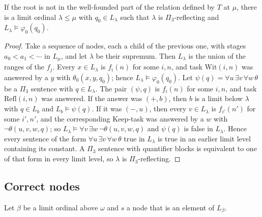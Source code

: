 \documentclass[11pt]{article}
\begin{document}
\begin{statement} If the root is not in the well-founded part of the relation defined by $T$ at $\mu$,
there is a limit ordinal $\lambda \le \mu$ with $q_0 \in L_{\lambda}$ such that $\lambda$ is $\Pi_3$-reflecting and
$L_{\lambda} \models \varphi_0(q_0)$.
\end{statement}

\begin{proof}
Take a sequence of nodes, each a child of the previous one, with stages $a_0 < a_1 < \cdots$ in $L_{\mu}$, and let
$\lambda$ be their supremum. Then $L_{\lambda}$ is the union of the ranges of the $f_j$. Every $x \in L_{\lambda}$ is
$f_i(n)$ for some $i, n$, and task $\mathrm{Wit}(i, n)$ was answered by a $y$ with $\theta_0(x, y, q_0)$; hence
$L_{\lambda} \models \varphi_0(q_0)$. Let $\psi(q) = \forall u\, \exists v\, \forall w\, \theta$ be a $\Pi_3$ sentence
with $q \in L_{\lambda}$. The pair $(\psi, q)$ is $f_i(n)$ for some $i, n$, and task $\mathrm{Refl}(i, n)$ was
answered. If the
answer was $(+, b)$, then $b$ is a limit below $\lambda$ with $q \in L_b$ and $L_b \models \psi(q)$. If it was
$(-, u)$, then every $v \in L_{\lambda}$ is $f_{i'}(n')$ for some $i', n'$, and the corresponding Keep-task was answered by
a $w$ with $\neg\theta(u, v, w, q)$; so $L_{\lambda} \models \forall v\, \exists w\, \neg\theta(u, v, w, q)$ and
$\psi(q)$ is false in $L_{\lambda}$. Hence every sentence of the form $\forall u\, \exists v\, \forall w\, \theta$ true
in $L_{\lambda}$ is true in an earlier limit level containing its constant. A $\Pi_3$ sentence with quantifier blocks is
equivalent to one of that form in every limit level, so $\lambda$ is $\Pi_3$-reflecting.
\end{proof}

\subsection{Correct nodes}

Let $\beta$ be a limit ordinal above $\omega$ and $s$ a node that is an element of $L_{\beta}$.
\end{document}
